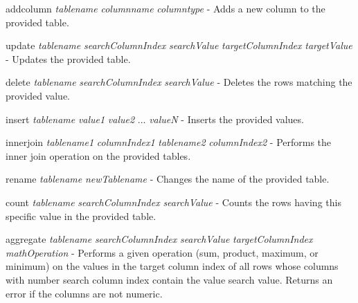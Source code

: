 \begin{DoxyItemize}
\item addcolumn {\itshape tablename} {\itshape columnname} {\itshape columntype} -\/ Adds a new column to the provided table.
\item update {\itshape tablename} {\itshape search\+Column\+Index} {\itshape search\+Value} {\itshape target\+Column\+Index} {\itshape target\+Value} -\/ Updates the provided table.
\item delete {\itshape tablename} {\itshape search\+Column\+Index} {\itshape search\+Value} -\/ Deletes the rows matching the provided value.
\item insert {\itshape tablename} {\itshape value1} {\itshape value2} ... {\itshape valueN} -\/ Inserts the provided values.
\item innerjoin {\itshape tablename1} {\itshape column\+Index1} {\itshape tablename2} {\itshape column\+Index2} -\/ Performs the inner join operation on the provided tables.
\item rename {\itshape tablename} {\itshape new\+Tablename} -\/ Changes the name of the provided table.
\item count {\itshape tablename} {\itshape search\+Column\+Index} {\itshape search\+Value} -\/ Counts the rows having this specific value in the provided table.
\item aggregate {\itshape tablename} {\itshape search\+Column\+Index} {\itshape search\+Value} {\itshape target\+Column\+Index} {\itshape math\+Operation} -\/ Performs a given operation (sum, product, maximum, or minimum) on the values in the target column index of all rows whose columns with number search column index contain the value search value. Returns an error if the columns are not numeric. 
\end{DoxyItemize}